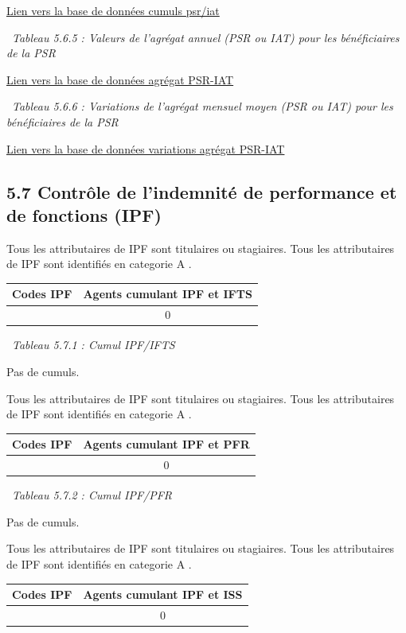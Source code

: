 \href{../Bases/Reglementation/personnels.psr.iat.csv}{Lien vers la base de
données cumuls psr/iat}

~\emph{Tableau 5.6.5 : Valeurs de l'agrégat annuel (PSR ou IAT) pour les
bénéficiaires de la PSR}

\href{../Bases/Remunerations/beneficiaires.PSR.IAT.csv}{Lien vers la base
de données agrégat PSR-IAT}

~\emph{Tableau 5.6.6 : Variations de l'agrégat mensuel moyen (PSR ou
IAT) pour les bénéficiaires de la PSR}

\href{../Bases/Remunerations/beneficiaires.PSR.IAT.Variation.csv}{Lien vers
la base de données variations agrégat PSR-IAT}

\hypertarget{controle-de-lindemnite-de-performance-et-de-fonctions-ipf}{%
\subsection{5.7 Contrôle de l'indemnité de performance et de fonctions
(IPF)}\label{controle-de-lindemnite-de-performance-et-de-fonctions-ipf}}

Tous les attributaires de IPF sont titulaires ou stagiaires. Tous les
attributaires de IPF sont identifiés en categorie A .

\begin{longtable}[]{@{}cc@{}}
\toprule
Codes IPF & Agents cumulant IPF et IFTS\tabularnewline
\midrule
\endhead
& 0\tabularnewline
\bottomrule
\end{longtable}

~\emph{Tableau 5.7.1 : Cumul IPF/IFTS}

Pas de cumuls.

Tous les attributaires de IPF sont titulaires ou stagiaires. Tous les
attributaires de IPF sont identifiés en categorie A .

\begin{longtable}[]{@{}cc@{}}
\toprule
Codes IPF & Agents cumulant IPF et PFR\tabularnewline
\midrule
\endhead
& 0\tabularnewline
\bottomrule
\end{longtable}

~\emph{Tableau 5.7.2 : Cumul IPF/PFR}

Pas de cumuls.

Tous les attributaires de IPF sont titulaires ou stagiaires. Tous les
attributaires de IPF sont identifiés en categorie A .

\begin{longtable}[]{@{}cc@{}}
\toprule
Codes IPF & Agents cumulant IPF et ISS\tabularnewline
\midrule
\endhead
& 0\tabularnewline
\bottomrule
\end{longtable}


